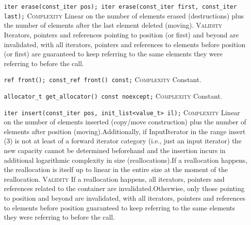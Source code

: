 \noindent{}\hspace*{0.25em}\lstinline[basicstyle=\ttfamily\color{corange}]{iter erase(const_iter pos); iter erase(const_iter first, const_iter last);} \textsc{Complexity} Linear on the number of elements erased (destructions) plus the number of elements after the last element deleted (moving). \textsc{Validity} Iterators, pointers and references pointing to position (or first) and beyond are invalidated, with all iterators, pointers and references to elements before position (or first) are guaranteed to keep referring to the same elements they were referring to before the call.\\\vspace{-0.6em}

\noindent{}\hspace*{0.25em}\lstinline[basicstyle=\ttfamily\color{cgreen}]{ref front(); const_ref front() const;} \textsc{Complexity} Constant.\\\vspace{-0.6em}

\noindent{}\hspace*{0.25em}\lstinline[basicstyle=\ttfamily\color{cgreen}]{allocator_t get_allocator() const noexcept;} \textsc{Complexity} Constant.\\\vspace{-0.6em}

\noindent{}\hspace*{0.25em}\lstinline[basicstyle=\ttfamily\color{corange}]{iter insert(const_iter pos, init_list<value_t> il);} \textsc{Complexity} Linear on the number of elements inserted (copy/move construction) plus the number of elements after position (moving).Additionally, if InputIterator in the range insert (3) is not at least of a forward iterator category (i.e., just an input iterator) the new capacity cannot be determined beforehand and the insertion incurs in additional logarithmic complexity in size (reallocations).If a reallocation happens, the reallocation is itself up to linear in the entire size at the moment of the reallocation. \textsc{Validity} If a reallocation happens, all iterators, pointers and references related to the container are invalidated.Otherwise, only those pointing to position and beyond are invalidated, with all iterators, pointers and references to elements before position guaranteed to keep referring to the same elements they were referring to before the call.\\\vspace{-0.6em}

